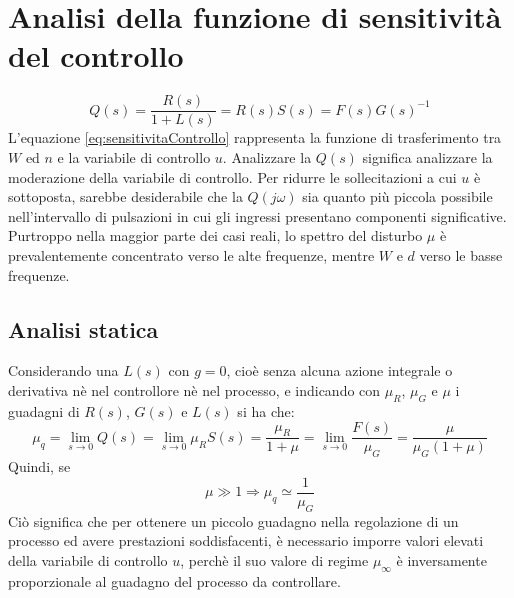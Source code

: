 \documentclass[a4paper]{report}
\begin{document}
\section{Analisi della funzione di sensitivit\`a del controllo}
\begin{equation}\label{eq:sensitivitaControllo}
  Q(s) = \dfrac{R(s)}{1 + L(s)} = R(s) S(s) = F(s) G(s)^{-1}
\end{equation}
L'equazione \ref{eq:sensitivitaControllo} rappresenta la funzione di
trasferimento tra $W$ ed $n$ e la variabile di controllo
$u$. Analizzare la $Q(s)$ significa analizzare la moderazione della
variabile di controllo. Per ridurre le sollecitazioni a cui $u$ \`e
sottoposta, sarebbe desiderabile che la $Q(j \omega)$ sia quanto pi\`u
piccola possibile nell'intervallo di pulsazioni in cui gli ingressi
presentano componenti significative. Purtroppo nella maggior parte dei
casi reali, lo spettro del disturbo $\mu$ \`e prevalentemente
concentrato verso le alte frequenze, mentre $W$ e $d$ verso le basse
frequenze.

\subsection{Analisi statica}
Considerando una $L(s)$ con $g = 0$, cio\`e senza alcuna azione
integrale o derivativa n\`e nel controllore n\`e nel processo, e
indicando con $\mu_R$, $\mu_G$ e $\mu$ i guadagni di $R(s)$, $G(s)$ e
$L(s)$ si ha che:
\[
\mu_q = \lim_{s \to 0} Q(s) = \lim_{s \to 0} \mu_R S(s) =
\dfrac{\mu_R}{1 + \mu} = \lim_{s \to 0} \dfrac{F(s)}{\mu_G} =
\dfrac{\mu}{\mu_G(1 + \mu)}
\]
Quindi, se
\[
\mu \gg 1 \Rightarrow \mu_q \simeq \dfrac{1}{\mu_G}
\]
Ci\`o significa che per ottenere un piccolo guadagno nella regolazione
di un processo ed avere prestazioni soddisfacenti, \`e necessario
imporre valori elevati della variabile di controllo $u$, perch\`e il
suo valore di regime $\mu_{\infty}$ \`e inversamente proporzionale al
guadagno del processo da controllare.
\end{document}

